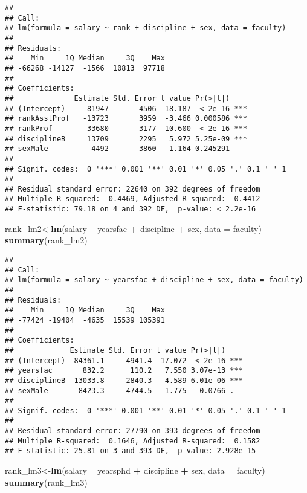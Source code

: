 \documentclass[]{article}
\newenvironment{Shaded}{\begin{snugshade}}{\end{snugshade}}
\newcommand{\KeywordTok}[1]{\textcolor[rgb]{0.13,0.29,0.53}{\textbf{#1}}}
\newcommand{\DataTypeTok}[1]{\textcolor[rgb]{0.13,0.29,0.53}{#1}}
\newcommand{\StringTok}[1]{\textcolor[rgb]{0.31,0.60,0.02}{#1}}
\newcommand{\OperatorTok}[1]{\textcolor[rgb]{0.81,0.36,0.00}{\textbf{#1}}}
\newcommand{\NormalTok}[1]{#1}
\begin{document}
\begin{verbatim}
## 
## Call:
## lm(formula = salary ~ rank + discipline + sex, data = faculty)
## 
## Residuals:
##    Min     1Q Median     3Q    Max 
## -66268 -14127  -1566  10813  97718 
## 
## Coefficients:
##              Estimate Std. Error t value Pr(>|t|)    
## (Intercept)     81947       4506  18.187  < 2e-16 ***
## rankAsstProf   -13723       3959  -3.466 0.000586 ***
## rankProf        33680       3177  10.600  < 2e-16 ***
## disciplineB     13709       2295   5.972 5.25e-09 ***
## sexMale          4492       3860   1.164 0.245291    
## ---
## Signif. codes:  0 '***' 0.001 '**' 0.01 '*' 0.05 '.' 0.1 ' ' 1
## 
## Residual standard error: 22640 on 392 degrees of freedom
## Multiple R-squared:  0.4469, Adjusted R-squared:  0.4412 
## F-statistic: 79.18 on 4 and 392 DF,  p-value: < 2.2e-16
\end{verbatim}

\begin{Shaded}
\begin{Highlighting}[]
\NormalTok{rank_lm2<-}\KeywordTok{lm}\NormalTok{(salary }\OperatorTok{~}\StringTok{ }\NormalTok{yearsfac }\OperatorTok{+}\StringTok{ }\NormalTok{discipline  }\OperatorTok{+}\StringTok{ }\NormalTok{sex, }\DataTypeTok{data =}\NormalTok{ faculty)}
\KeywordTok{summary}\NormalTok{(rank_lm2)}
\end{Highlighting}
\end{Shaded}

\begin{verbatim}
## 
## Call:
## lm(formula = salary ~ yearsfac + discipline + sex, data = faculty)
## 
## Residuals:
##    Min     1Q Median     3Q    Max 
## -77424 -19404  -4635  15539 105391 
## 
## Coefficients:
##             Estimate Std. Error t value Pr(>|t|)    
## (Intercept)  84361.1     4941.4  17.072  < 2e-16 ***
## yearsfac       832.2      110.2   7.550 3.07e-13 ***
## disciplineB  13033.8     2840.3   4.589 6.01e-06 ***
## sexMale       8423.3     4744.5   1.775   0.0766 .  
## ---
## Signif. codes:  0 '***' 0.001 '**' 0.01 '*' 0.05 '.' 0.1 ' ' 1
## 
## Residual standard error: 27790 on 393 degrees of freedom
## Multiple R-squared:  0.1646, Adjusted R-squared:  0.1582 
## F-statistic: 25.81 on 3 and 393 DF,  p-value: 2.928e-15
\end{verbatim}

\begin{Shaded}
\begin{Highlighting}[]
\NormalTok{rank_lm3<-}\KeywordTok{lm}\NormalTok{(salary }\OperatorTok{~}\StringTok{ }\NormalTok{yearsphd }\OperatorTok{+}\StringTok{ }\NormalTok{discipline  }\OperatorTok{+}\StringTok{ }\NormalTok{sex, }\DataTypeTok{data =}\NormalTok{ faculty)}
\KeywordTok{summary}\NormalTok{(rank_lm3)}
\end{Highlighting}
\end{Shaded}
\end{document}

